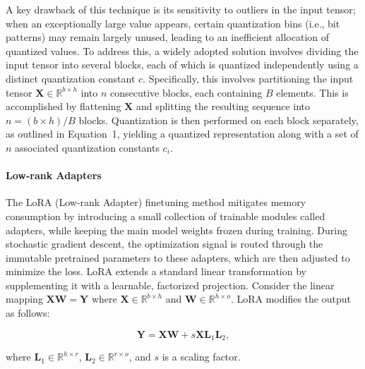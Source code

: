 A key drawback of this technique is its sensitivity to outliers in the input tensor; when an exceptionally large value appears, certain quantization bins (i.e., bit patterns) may remain largely unused, leading to an inefficient allocation of quantized values. To address this, a widely adopted solution involves dividing the input tensor into several blocks, each of which is quantized independently using a distinct quantization constant $c$. Specifically, this involves partitioning the input tensor $\mathbf{X}\in \mathbb{R}^{b\times h}$ into $n$ consecutive blocks, each containing $B$ elements. This is accomplished by flattening $\mathbf{X}$ and splitting the resulting sequence into $n = ({b\times h} )/{B}$ blocks. Quantization is then performed on each block separately, as outlined in Equation~1, yielding a quantized representation along with a set of $n$ associated quantization constants $c_i$.

\paragraph{Low-rank Adapters} The LoRA (Low-rank Adapter) finetuning method \citep{hu2021lora} mitigates memory consumption by introducing a small collection of trainable modules called adapters, while keeping the main model weights frozen during training. During stochastic gradient descent, the optimization signal is routed through the immutable pretrained parameters to these adapters, which are then adjusted to minimize the loss. LoRA extends a standard linear transformation by supplementing it with a learnable, factorized projection. Consider the linear mapping ${\mathbf{X} \mathbf{W} = \mathbf{Y}}$ where $\mathbf{X}\in  \mathbb{R}^{b\times h}$ and $\mathbf{W}\in  \mathbb{R}^{h\times o}$. LoRA modifies the output as follows:

\begin{equation}
    \mathbf{Y} = \mathbf{X}\mathbf{W} + s\mathbf{X}\mathbf{L}_1\mathbf{L}_2,
\end{equation}

where $\mathbf{L}_1\in  \mathbb{R}^{h\times r}$, $\mathbf{L}_2\in  \mathbb{R}^{r\times o}$, and $s$ is a scaling factor.

